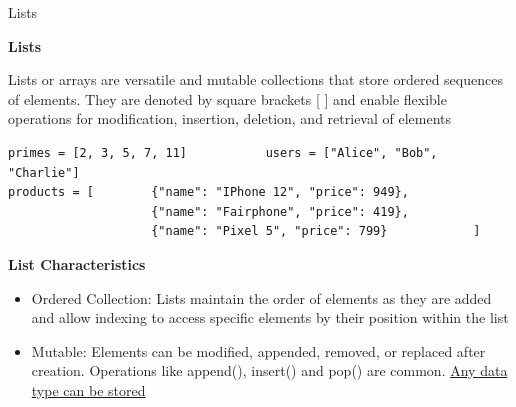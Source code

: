 \documentclass[
	11pt, 
]{beamer}
\begin{document}
\begin{frame}[fragile]{Lists}
\scriptsize
    
\begin{block}{\textbf{Lists}}
    
Lists or arrays are versatile and mutable collections that store ordered sequences of elements. They are denoted by square brackets [ ] and enable flexible operations for modification, insertion, deletion, and retrieval of elements

\end{block}
\begin{verbatim}
primes = [2, 3, 5, 7, 11]           users = ["Alice", "Bob", "Charlie"]
products = [        {"name": "IPhone 12", "price": 949},
                    {"name": "Fairphone", "price": 419},
                    {"name": "Pixel 5", "price": 799}            ]  \end{verbatim}

\begin{exampleblock}{\textbf{List Characteristics}}
    \begin{itemize}
        \item Ordered Collection: Lists maintain the order of elements as they are added and allow indexing to access specific elements by their position within the list
        \item Mutable: Elements can be modified, appended, removed, or replaced after creation. Operations like append(), insert() and pop() are common. \underline{Any data type can be stored}
    \end{itemize}    
\end{exampleblock}


\end{frame}



\end{document}
